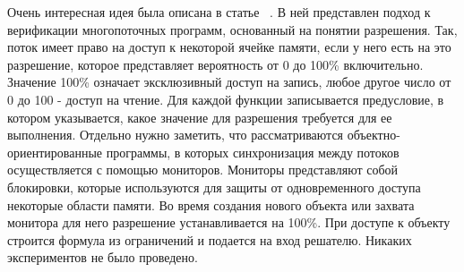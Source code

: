 %
%


Очень интересная идея была описана в статье ~\cite{Leino:2009}. В ней представлен подход к верификации многопоточных программ, основанный на понятии разрешения.
Так, поток имеет право на доступ к некоторой ячейке памяти, если у него есть на это разрешение, которое представляет вероятность от 0 до 100\% включительно.
Значение 100\% означает эксклюзивный доступ на запись, любое другое число от 0 до 100 - доступ на чтение.
Для каждой функции записывается предусловие, в котором указывается, какое значение для разрешения требуется для ее выполнения.
Отдельно нужно заметить, что рассматриваются объектно-ориентированные программы, в которых синхронизация между потоков осуществляется с помощью мониторов.
Мониторы представляют собой блокировки, которые используются для защиты от одновременного доступа некоторые области памяти.
Во время создания нового объекта или захвата монитора для него разрешение устанавливается на 100\%.
При доступе к объекту строится формула из ограничений и подается на вход решателю.
Никаких экспериментов не было проведено.

